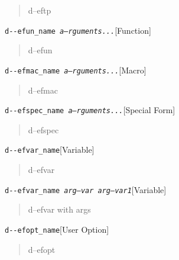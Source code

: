 \documentclass{book}
\begin{document}
%
\begin{quote}
\unskip{\parskip=0pt\noindent}%
d--eftp
\end{quote}

\noindent\texttt{d{-}{-}efun\_name \EmbracOn{}\textnormal{\textsl{a--rguments...}}\EmbracOff{}}\hfill[Function]



%
\begin{quote}
\unskip{\parskip=0pt\noindent}%
d--efun
\end{quote}

\noindent\texttt{d{-}{-}efmac\_name \EmbracOn{}\textnormal{\textsl{a--rguments...}}\EmbracOff{}}\hfill[Macro]



%
\begin{quote}
\unskip{\parskip=0pt\noindent}%
d--efmac
\end{quote}

\noindent\texttt{d{-}{-}efspec\_name \EmbracOn{}\textnormal{\textsl{a--rguments...}}\EmbracOff{}}\hfill[Special Form]



%
\begin{quote}
\unskip{\parskip=0pt\noindent}%
d--efspec
\end{quote}

\noindent\texttt{d{-}{-}efvar\_name}\hfill[Variable]



%
\begin{quote}
\unskip{\parskip=0pt\noindent}%
d--efvar
\end{quote}

\noindent\texttt{d{-}{-}efvar\_name \EmbracOn{}\textnormal{\textsl{arg--var arg--var1}}\EmbracOff{}}\hfill[Variable]



%
\begin{quote}
\unskip{\parskip=0pt\noindent}%
d--efvar with args
\end{quote}

\noindent\texttt{d{-}{-}efopt\_name}\hfill[User Option]



%
\begin{quote}
\unskip{\parskip=0pt\noindent}%
d--efopt
\end{quote}
\end{document}

